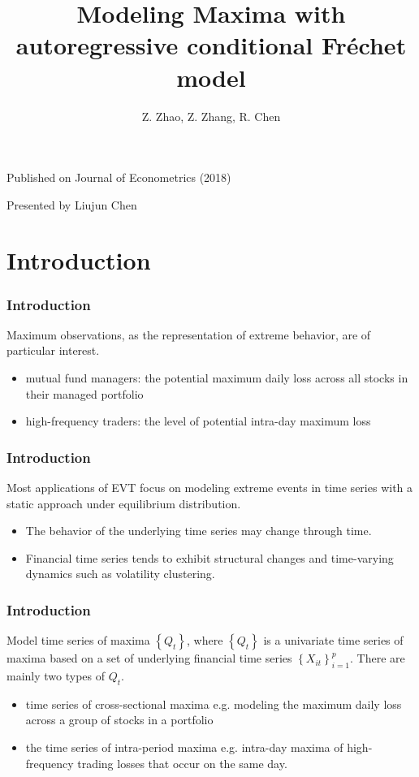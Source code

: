 \documentclass{beamer}
\author{Z. Zhao, Z. Zhang, R. Chen}
\title{Modeling Maxima with autoregressive conditional Fr\'echet model}
\newcommand{\set}[1]{\left\{#1\right\}}
\begin{document}
\begin{frame}
\titlepage
\begin{center}
    Published on Journal of Econometrics (2018)
    \bigskip

    Presented by Liujun Chen
    \bigskip
    \bigskip
\end{center}
\end{frame}


\section{Introduction}

\begin{frame}
    \frametitle{Introduction}
    Maximum
    observations, as the representation of extreme behavior, are of particular interest.
    \bigskip
\begin{itemize}
    \item mutual fund managers: the potential maximum daily loss across all stocks in their managed portfolio
    \bigskip
    \item high-frequency traders: the level of potential
    intra-day maximum loss 
\end{itemize}
    

\end{frame}

\begin{frame}
    \frametitle{Introduction}
    Most applications of EVT focus on modeling extreme events in time series with a
    static approach under equilibrium distribution.
    
    \bigskip
    \begin{itemize}
        \item  The behavior of the underlying time series may change through
        time. 
        \bigskip
        \item  Financial time series tends to exhibit structural changes and time-varying dynamics such as volatility clustering.
    \end{itemize}
\end{frame}


\begin{frame}
    \frametitle{Introduction}
    Model time series of maxima $\set{Q_t}$, where $\set{Q_t}$ is a univariate time series
    of maxima based on a set of underlying financial time series $\set{X_{it}}_{i=1}^p$. There are mainly two types of $Q_t$.
    \bigskip

    \begin{itemize}
        \item time series of cross-sectional maxima e.g. modeling the maximum daily loss across a group of stocks in a portfolio
        \bigskip
        \item the time series of intra-period maxima e.g. intra-day maxima of high-frequency
        trading losses that occur on the same day.
    \end{itemize}

\end{frame}
\end{document}
